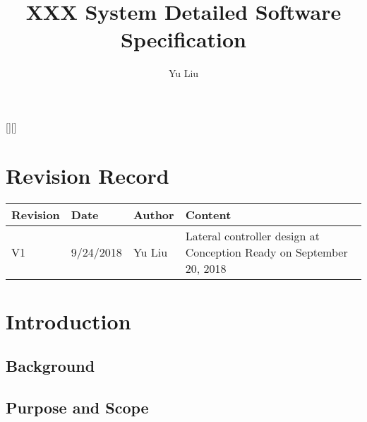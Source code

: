 \documentclass[11pt,letterpaper]{report}
\begin{document}
\newtheorem{lem}{\bf Lemma}%
\newtheorem{rem}{\bf Remark}%
\newtheorem{pro}{\bf Proposition}%
\newtheorem{defn}{\bf Definition}%
\newtheorem{thm}{\bf Theorem}%
\newtheorem{assu}{Assumption}%
\newcommand{\tr}{{\rm tr}}
\newcommand{\ts}{& \hspace{-0.05in}}
\newcommand{\nn}{\nonumber}
\newtheorem{ex}{Example}[section]
\newcommand{\bp}{\bigskip}
\newcommand{\slp}{\smallskip}
\newcommand{\diag}{{\rm diag}}
\newcommand{\sign}{{\rm sign}}

\newcommand{\rank}{{\rm rank}}
\newcommand{\qed}{\hfill \ensuremath{\Box}}

[][\FBwidth]

\title{\bf \LARGE XXX System Detailed Software Specification}

\author{Yu Liu}

\date{}
\maketitle

\chapter*{Revision Record}
\begin{table}[ht]
  \centering
  \begin{tabular}{|p{3cm}| p{3cm}| p{3cm}| p{7cm}|}
    \hline
    {\bf Revision}& {\bf Date}& {\bf Author}& {\bf Content} \\
    \hline
    V1      & 9/24/2018 & Yu Liu & Lateral controller design at
                                   Conception Ready on September 20,
                                   2018\\
    \hline
                                
  \end{tabular}
\end{table}


\newpage
\tableofcontents
\newpage


\chapter{Introduction}
\section{Background}
\section{Purpose and Scope}
\end{document}
